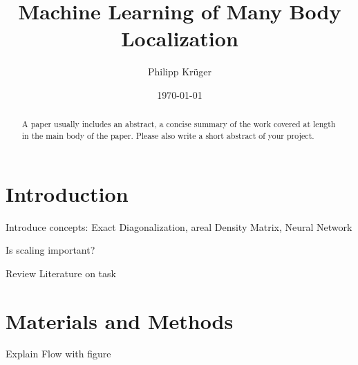 \documentclass[reprint,amsmath,amssymb,aps,prb]{revtex4-2}
\begin{document}
%

\title{Machine Learning of Many Body Localization}

\author{Philipp Krüger}

\date{\today}%

\begin{abstract}
A paper usually includes an abstract, a concise summary of the work covered at length in the main body of the paper. Please also write a short abstract of your project.
\end{abstract}


\maketitle

\section{Introduction}%

Introduce concepts: Exact Diagonalization, areal Density Matrix, Neural Network

Is scaling important?

Review Literature on task

\section{Materials and Methods}%

Explain Flow with figure
\end{document}

